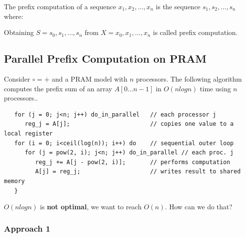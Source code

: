 
The prefix computation of a sequence $x_1, x_2, \ldots, x_n$ is the sequence $s_1, s_2, \ldots, s_n$ where:
\begin{abstract}
   \begin{align}
      s_0 = x_0 \\
      s_1 = x_0 \circ x_1 \\
      \ldots \\
      s_i = x_0 \circ x_1 \circ \ldots \circ x_{i} \quad i=0,\ldots,n-1\\
      s_i = s_{i-1} \circ x_i \quad i=1,\ldots,n-1\\
      s_n = x_1 \circ x_2 \circ \ldots \circ x_{n-1} \quad \text{\textred{Questo non mi torna molto}}
   \end{align}
\end{abstract}

\begin{definition}
   Obtaining $S = {s_0, s_1, \ldots, s_n}$ from $X = {x_0, x_1, \ldots, x_n}$ is called prefix computation.
\end{definition}

\subsection{Parallel Prefix Computation on PRAM}
Consider $\circ = +$ and a PRAM model with $n$ processors. The following algorithm computes the prefix sum of an array $A[0 \ldots n-1]$ in $O(nlog n)$ time using $n$ processors..
\begin{lstlisting}
   for (j = 0; j<n; j++) do_in_parallel   // each processor j
      reg_j = A[j];                       // copies one value to a local register
   for (i = 0; i<ceil(log(n)); i++) do    // sequential outer loop
      for (j = pow(2, i); j<n; j++) do_in_parallel // each proc. j
         reg_j += A[j - pow(2, i)];       // performs computation
         A[j] = reg_j;                    // writes result to shared memory
   }
\end{lstlisting}

$O(nlog n)$ is \textbf{not optimal}, we want to reach $O(n)$.
How can we do that?
\subsubsection{Approach 1}

